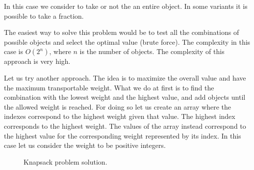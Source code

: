 In this case we consider to take or not the an entire object. In some variants it is possible to take a fraction.

The easiest way to solve this problem would be to test all the combinations of possible objects and select the optimal value (brute force). The complexity in this case is \(O(2^{n})\), where \(n\) is the number of objects. The complexity of this approach is very high.

Let us try another approach. The idea is to maximize the overall value and have the maximum transportable weight. What we do at first is to find the combination with the lowest weight and the highest value, and add objects until the allowed weight is reached. For doing so let us create an array where the indexes correspond to the highest weight given that value. The highest index corresponds to the highest weight. The values of the array instead correspond to the highest value for the corresponding weight represented by its index. In this case let us consider the weight to be positive integers. 

\begin{figure}[H]
\centering
{}
\caption[Knapsack problem solution.]{Knapsack problem solution.}
\end{figure}

